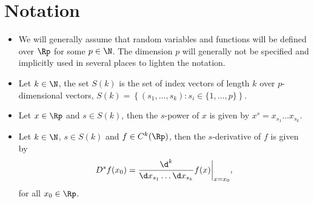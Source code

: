 \section*{Notation}

\begin{itemize}
    \item We will generally assume that random variables and functions will be defined over $\Rp$ for some $p \in \N$. The dimension $p$ will generally not be specified and implicitly used in several places to lighten the notation.
    \item Let $k \in \N$, the set $S(k)$ is the set of index vectors of length $k$ over $p$-dimensional vectors, $S(k) = \left\{ (s_1, \ldots, s_k) : s_i \in \{1, \ldots, p\}\right\}$.
    \item Let $x \in \Rp$ and $s \in S(k)$, then the $s$-power of $x$ is given by $x^s = x_{s_1} \ldots x_{s_k}$.
    \item {
        Let $k \in \N$, $s \in S(k)$ and $f \in C^k(\Rp)$, then the $s$-derivative of $f$ is given by
        \begin{equation*}
            D^s f(x_0) = \frac{\d^k}{\d x_{s_1} \ldots \d x_{s_k}} f(x) \bigg|_{x=x_0},
        \end{equation*}
        for all $x_0 \in \Rp$.  
    }
\end{itemize}